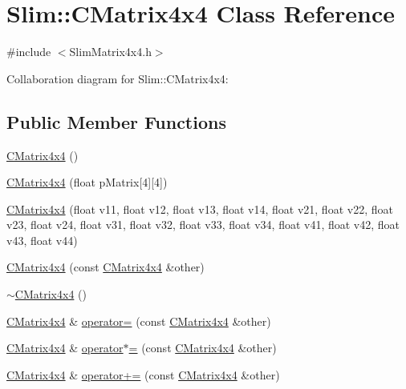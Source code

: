 \hypertarget{class_slim_1_1_c_matrix4x4}{}\section{Slim\+:\+:C\+Matrix4x4 Class Reference}
\label{class_slim_1_1_c_matrix4x4}


{\ttfamily \#include $<$Slim\+Matrix4x4.\+h$>$}



Collaboration diagram for Slim\+:\+:C\+Matrix4x4\+:
\subsection*{Public Member Functions}
\begin{DoxyCompactItemize}
\item 
\hyperlink{class_slim_1_1_c_matrix4x4_ab0db69253f596fd2ff81c7a887cf55ca}{C\+Matrix4x4} ()
\item 
\hyperlink{class_slim_1_1_c_matrix4x4_a1f3131adf631af7ec192dc4a21a91c80}{C\+Matrix4x4} (float p\+Matrix\mbox{[}4\mbox{]}\mbox{[}4\mbox{]})
\item 
\hyperlink{class_slim_1_1_c_matrix4x4_a0eb2b9efbf077425e4202fe80023fe38}{C\+Matrix4x4} (float v11, float v12, float v13, float v14, float v21, float v22, float v23, float v24, float v31, float v32, float v33, float v34, float v41, float v42, float v43, float v44)
\item 
\hyperlink{class_slim_1_1_c_matrix4x4_aae54c87f8026b9347d756ae37029b60b}{C\+Matrix4x4} (const \hyperlink{class_slim_1_1_c_matrix4x4}{C\+Matrix4x4} \&other)
\item 
\hyperlink{class_slim_1_1_c_matrix4x4_a33ff914f4d409bd664c451f6b1e33ead}{$\sim$\+C\+Matrix4x4} ()
\item 
\hyperlink{class_slim_1_1_c_matrix4x4}{C\+Matrix4x4} \& \hyperlink{class_slim_1_1_c_matrix4x4_afaff0b0992ac0b60c6763cfb77601f60}{operator=} (const \hyperlink{class_slim_1_1_c_matrix4x4}{C\+Matrix4x4} \&other)
\item 
\hyperlink{class_slim_1_1_c_matrix4x4}{C\+Matrix4x4} \& \hyperlink{class_slim_1_1_c_matrix4x4_a9ce4ed68708773116f32e67046eac069}{operator$\ast$=} (const \hyperlink{class_slim_1_1_c_matrix4x4}{C\+Matrix4x4} \&other)
\item 
\hyperlink{class_slim_1_1_c_matrix4x4}{C\+Matrix4x4} \& \hyperlink{class_slim_1_1_c_matrix4x4_a460e6ceef684206fdf1c91acccecbae9}{operator+=} (const \hyperlink{class_slim_1_1_c_matrix4x4}{C\+Matrix4x4} \&other)
\item 

\end{DoxyCompactItemize}
